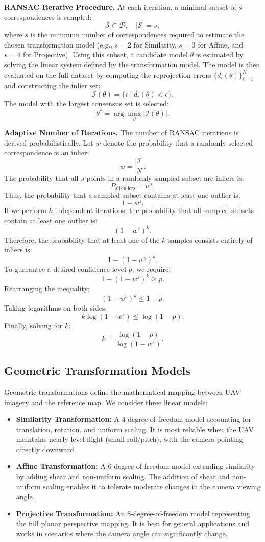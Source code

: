 \textbf{RANSAC Iterative Procedure.}
At each iteration, a minimal subset of $s$ correspondences is sampled:
\[
\mathcal{S} \subset \mathcal{D}, \quad |\mathcal{S}| = s,
\]
where $s$ is the minimum number of correspondences required to estimate
the chosen transformation model (e.g., $s=2$ for Similarity, $s=3$ for Affine, and $s=4$ for Projective).
Using this subset, a candidate model $\theta$ is estimated by solving
the linear system defined by the transformation model.
The model is then evaluated on the full dataset by computing
the reprojection errors $\{d_i(\theta)\}_{i=1}^{N}$ and constructing
the inlier set:
\[
\mathcal{I}(\theta) = \{ i \mid d_i(\theta) < \epsilon \}.
\]
The model with the largest consensus set is selected:
\[
\theta^* = \arg\max_{\theta} |\mathcal{I}(\theta)|.
\]

\textbf{Adaptive Number of Iterations.}
The number of RANSAC iterations is derived probabilistically.
Let $w$ denote the probability that a randomly selected correspondence is an inlier:
\[
w = \frac{|\mathcal{I}|}{N}.
\]
The probability that all $s$ points in a randomly sampled subset are inliers is:
\[
P_{\text{all-inliers}} = w^s.
\]
Thus, the probability that a sampled subset contains at least one outlier is:
\[
1 - w^s.
\]
If we perform $k$ independent iterations, the probability that all sampled subsets
contain at least one outlier is:
\[
(1 - w^s)^k.
\]
Therefore, the probability that at least one of the $k$ samples consists entirely
of inliers is:
\[
1 - (1 - w^s)^k.
\]
To guarantee a desired confidence level $p$, we require:
\[
1 - (1 - w^s)^k \geq p.
\]
Rearranging the inequality:
\[
(1 - w^s)^k \leq 1 - p.
\]
Taking logarithms on both sides:
\[
k \log(1 - w^s) \leq \log(1 - p).
\]
Finally, solving for $k$:
\[
k = \frac{\log(1 - p)}{\log(1 - w^s)}.
\]


\subsection{Geometric Transformation Models}\label{subsec:transformation_models}
Geometric transformations define the mathematical mapping between UAV imagery and the reference map. We consider three linear models:

\begin{itemize}
    \item \textbf{Similarity Transformation:} A 4-degree-of-freedom model accounting for translation, rotation, and uniform scaling. It is most reliable when the UAV maintains nearly level flight (small roll/pitch), with the camera pointing directly downward.

    \item \textbf{Affine Transformation:} A 6-degree-of-freedom model extending similarity by adding shear and non-uniform scaling. The addition of shear and non-uniform scaling enables it to tolerate moderate changes in the camera viewing angle.

    \item \textbf{Projective Transformation:} An 8-degree-of-freedom model representing the full planar perspective mapping. It is best for general applications and works in scenarios where the camera angle can significantly change.
\end{itemize}

